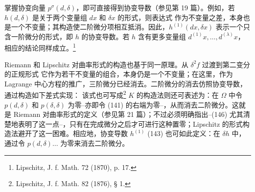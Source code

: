 掌握协变向量 $p^\sigma(d,\delta)$，即可直接得到协变导数（参见第 19 篇）。例如，若 $h(d,\delta)$ 是关于两个变量组 $dx$ 和 $\delta x$ 的形式，则表达式
作为不变量之差，本身也是一个不变量；其构造使二阶微分项相互抵消。因此，$h^{(1)}(dx,\delta x)$ 表示一个只含一阶微分的形式，即 $h$ 的协变导数。若 $h$ 含有更多变量组 $d^{(1)}x,\ldots,d^{(\lambda)}x$，相应的结论同样成立。\footnote{Lipschitz, J. f. Math. 72 (1870), p. 17.}

Riemann 和 Lipschitz 对曲率形式的构造也基于同一原理。从 $\delta^2 f$ 过渡到\glqq{}第二变分的正规形式\grqq{}
它作为若干不变量的组合，本身仍是一个不变量；在这里，作为 Lagrange 中心方程的推广，三阶微分已经消去。二阶微分的消去仿照协变导数，通过构造如下差式实现：
该式也可写成\footnote{Lipschitz, J. f. Math. 82 (1876), § 1.}
$K$ 的构造法则还可表述为：在 $\Omega$ 中令 $p(d,\delta)$ 和 $p(\delta,\delta)$ 为零--亦即令 (141) 的右端为零--，从而消去二阶微分。这就是 Riemann 对曲率形式的定义（参见第 21 篇）；不过必须明确指出--(146) 尤其清楚地表明了这一点--，只有在完成微分之后才可进行这种置零；Lipschitz 的形式构造法避开了这一困难。相应地，协变导数 $h^{(1)}$ (143) 也可如此定义：在 $\delta h$ 中，通过令 $p(d,\delta)\ldots$ 为零来消去二阶微分。
